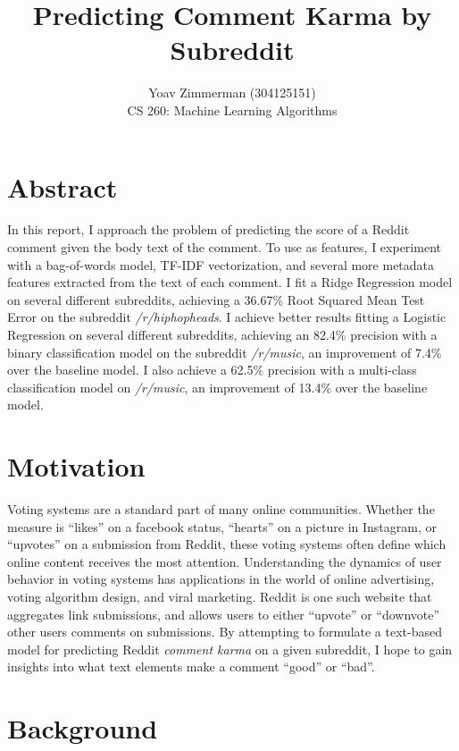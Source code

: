 \documentclass[11pt, twocolumn]{article}
\begin{document}
\title{Predicting Comment Karma by Subreddit}
\author{Yoav Zimmerman (304125151) \\
	    CS 260: Machine Learning Algorithms \\}
\maketitle

\section{Abstract}

In this report, I approach the problem of predicting the score of a Reddit comment given the body text of the comment. To use as features, I experiment with a bag-of-words model, TF-IDF vectorization, and several more metadata features extracted from the text of each comment. I fit a Ridge Regression model on several different subreddits, achieving a 36.67\% Root Squared Mean Test Error on the subreddit \textit{/r/hiphopheads}. I achieve better results fitting a Logistic Regression on several different subreddits, achieving an 82.4\% precision with a binary classification model on the subreddit \textit{/r/music}, an improvement of 7.4\% over the baseline model. I also achieve a 62.5\% precision with a multi-class classification model on \textit{/r/music}, an improvement of 13.4\% over the baseline model.

\section{Motivation}

Voting systems are a standard part of many online communities. Whether the measure is ``likes'' on a facebook status, “hearts” on a picture in Instagram, or “upvotes” on a submission from Reddit, these voting systems often define which online content receives the most attention. Understanding the dynamics of user behavior in voting systems has applications in the world of online advertising, voting algorithm design, and viral marketing. Reddit is one such website that aggregates link submissions, and allows users to either “upvote” or “downvote” other users comments on submissions. By attempting to formulate a text-based model for predicting Reddit \textit{comment karma} on a given subreddit, I hope to gain insights into what text elements make a comment ``good'' or ``bad''.

\section{Background}
\end{document}
